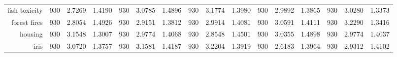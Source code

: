 \begin{table}[htbp]
{\begin{tabular}{rccccccccccccccc}
			fish toxicity                       & 930                                 & \cellcolor[rgb]{ .776,  .937,  .808}\textcolor[rgb]{ 0,  .38,  0}{2.7269} & 1.4190          & 930                            & 3.0785                                                                             & 1.4896          & 930                             & 3.1774                                                                    & 1.3980          & 930                             & 2.9892                                                                    & 1.3865          & 930                             & 3.0280          & 1.3373          \\
			forest fires                        & 930                                 & \cellcolor[rgb]{ .776,  .937,  .808}\textcolor[rgb]{ 0,  .38,  0}{2.8054} & 1.4926          & 930                            & 2.9151                                                                             & 1.3812          & 930                             & 2.9914                                                                    & 1.4081          & 930                             & 3.0591                                                                    & 1.4111          & 930                             & 3.2290          & 1.3416          \\
			housing                             & 930                                 & 3.1548                                                                    & 1.3007          & 930                            & 2.9774                                                                             & 1.4068          & 930                             & \cellcolor[rgb]{ .776,  .937,  .808}\textcolor[rgb]{ 0,  .38,  0}{2.8548} & 1.4501          & 930                             & 3.0355                                                                    & 1.4898          & 930                             & 2.9774          & 1.4037          \\
			iris                                & 930                                 & 3.0720                                                                    & 1.3757          & 930                            & 3.1581                                                                             & 1.4187          & 930                             & 3.2204                                                                    & 1.3919          & 930                             & \cellcolor[rgb]{ .776,  .937,  .808}\textcolor[rgb]{ 0,  .38,  0}{2.6183} & 1.3964          & 930                             & 2.9312          & 1.4102          \\

\end{tabular}}
\end{table}
